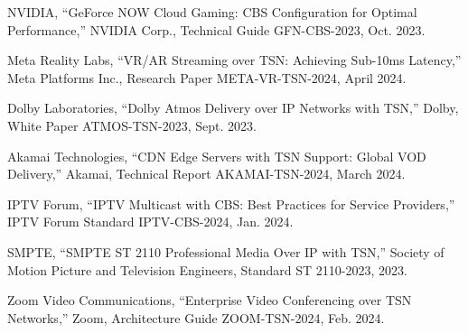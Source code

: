 \documentclass[10pt, journal, compsoc]{IEEEtran}
\begin{document}
\begin{thebibliography}{99}
NVIDIA, ``GeForce NOW Cloud Gaming: CBS Configuration for Optimal Performance,'' NVIDIA Corp., Technical Guide GFN-CBS-2023, Oct. 2023.

Meta Reality Labs, ``VR/AR Streaming over TSN: Achieving Sub-10ms Latency,'' Meta Platforms Inc., Research Paper META-VR-TSN-2024, April 2024.

Dolby Laboratories, ``Dolby Atmos Delivery over IP Networks with TSN,'' Dolby, White Paper ATMOS-TSN-2023, Sept. 2023.

Akamai Technologies, ``CDN Edge Servers with TSN Support: Global VOD Delivery,'' Akamai, Technical Report AKAMAI-TSN-2024, March 2024.

IPTV Forum, ``IPTV Multicast with CBS: Best Practices for Service Providers,'' IPTV Forum Standard IPTV-CBS-2024, Jan. 2024.

SMPTE, ``SMPTE ST 2110 Professional Media Over IP with TSN,'' Society of Motion Picture and Television Engineers, Standard ST 2110-2023, 2023.

Zoom Video Communications, ``Enterprise Video Conferencing over TSN Networks,'' Zoom, Architecture Guide ZOOM-TSN-2024, Feb. 2024.

\end{thebibliography}
\end{document}
